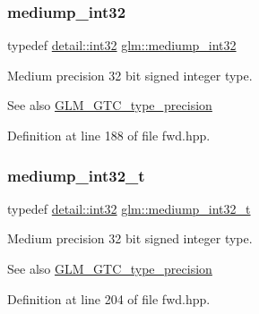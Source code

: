 \subsubsection{\texorpdfstring{mediump\+\_\+int32}{mediump\_int32}}
{\footnotesize\ttfamily typedef \hyperlink{namespaceglm_1_1detail_a9f85b4efeca416cdcec2fd08939a2e17}{detail\+::int32} \hyperlink{group__gtc__type__precision_ga0660a752402702f420f13c686a7fff29}{glm\+::mediump\+\_\+int32}}

Medium precision 32 bit signed integer type. \begin{DoxySeeAlso}{See also}
\hyperlink{group__gtc__type__precision}{G\+L\+M\+\_\+\+G\+T\+C\+\_\+type\+\_\+precision} 
\end{DoxySeeAlso}


Definition at line 188 of file fwd.\+hpp.

\mbox{\label{group__gtc__type__precision_gafd9b4bd9e4465aec63351b59100692c4}} 
\subsubsection{\texorpdfstring{mediump\+\_\+int32\+\_\+t}{mediump\_int32\_t}}
{\footnotesize\ttfamily typedef \hyperlink{namespaceglm_1_1detail_a9f85b4efeca416cdcec2fd08939a2e17}{detail\+::int32} \hyperlink{group__gtc__type__precision_gafd9b4bd9e4465aec63351b59100692c4}{glm\+::mediump\+\_\+int32\+\_\+t}}

Medium precision 32 bit signed integer type. \begin{DoxySeeAlso}{See also}
\hyperlink{group__gtc__type__precision}{G\+L\+M\+\_\+\+G\+T\+C\+\_\+type\+\_\+precision} 
\end{DoxySeeAlso}


Definition at line 204 of file fwd.\+hpp.

\mbox{\label{group__gtc__type__precision_ga603c695fe5cd677d3f72a81343e19a74}} 
